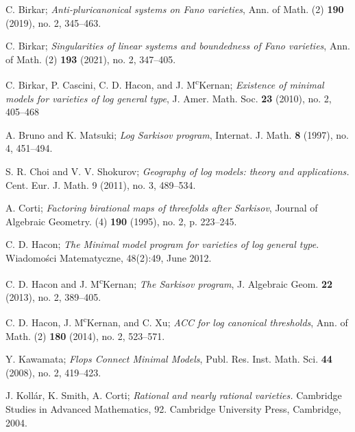 \documentclass[11pt]{amsart}
\begin{document}
\begin{thebibliography}{99}
   C. Birkar;
  \textit{Anti-pluricanonical systems on Fano varieties}, Ann. of Math. (2) \textbf{190} (2019), no. 2,  345--463.

  C. Birkar;
  \textit{Singularities of linear systems and boundedness of Fano varieties},
  Ann. of Math. (2) \textbf{193} (2021), no. 2, 347–405.

  C. Birkar, P. Cascini, C. D. Hacon, and J. M\textsuperscript{c}Kernan;  \textit{Existence of minimal models for varieties of log general type}, J. Amer. Math. Soc. \textbf{23} (2010), no. 2, 405--468

  A. Bruno and K. Matsuki;
  \textit{Log {S}arkisov program},
  Internat. J. Math. \textbf{8} (1997), no. 4, 451–494.

  S. R. Choi and V. V. Shokurov; \textit{Geography of log models: theory and applications.}
  Cent. Eur. J. Math. 9 (2011), no. 3, 489--534.

   A. Corti;
  \textit{Factoring birational maps of threefolds after {{Sarkisov}}},
  Journal of Algebraic Geometry. (4) \textbf{190} (1995), no. 2, p. 223--245.

  C. D. Hacon;
  \textit{The {{Minimal}} model program for {{varieties}} of log general type}.
  Wiadomo\'sci Matematyczne, 48(2):49, June 2012.

  C. D. Hacon and J. M\textsuperscript{c}Kernan;
  \textit{The {{Sarkisov}} program},
  J. Algebraic Geom. \textbf{22} (2013), no. 2, 389–405. 

   C. D. Hacon, J. M\textsuperscript{c}Kernan, and C. Xu; \textit{ACC for log canonical thresholds}, Ann. of Math. (2) \textbf{180} (2014), no. 2, 523--571.

  Y. Kawamata;
  \textit{Flops {{Connect Minimal Models}}},
  Publ. Res. Inst. Math. Sci. \textbf{44} (2008), no. 2, 419–423.

  J. Koll\'{a}r, K. Smith, A. Corti; \textit{Rational and nearly rational varieties.} Cambridge Studies in Advanced Mathematics, 92. Cambridge University Press, Cambridge, 2004.


\end{thebibliography}
\end{document}
